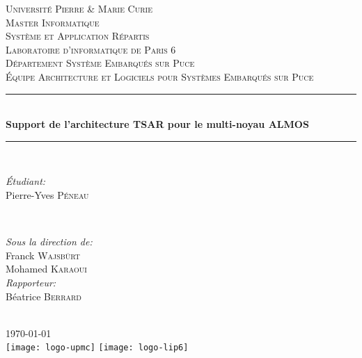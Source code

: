 \begin{titlepage}

\newcommand{\HRule}{\rule{\linewidth}{0.44mm}}
\center


\textsc{\LARGE Université Pierre \& Marie Curie}\\[0.44cm]
\textsc{\Large Master Informatique}\\[0.44cm]
\textsc{\large Système et Application Répartis}\\[1.44cm]

\textsc{\LARGE Laboratoire d'informatique de Paris 6}\\[0.44cm]
\textsc{\Large Département Système Embarqués sur Puce}\\[0.44cm]
\textsc{\large Équipe Architecture et Logiciels pour Systèmes Embarqués sur
  Puce}\\[1.44cm]

\HRule \\[0.4cm] { \huge
  \bfseries Support de l'architecture TSAR pour le multi-noyau ALMOS}\\[0.4cm]
\HRule \\[1.44cm]


\begin{minipage}{0.4\textwidth}
\begin{flushleft} \large
\emph{Étudiant:}\\ Pierre-Yves \textsc{Péneau}
\end{flushleft}
\end{minipage}
~
\begin{minipage}{0.4\textwidth}
\begin{flushright} \large
  \emph{Sous la direction de:} \\ Franck \textsc{Wajsbürt}\\ Mohamed
  \textsc{Karaoui}\\\vspace{1.44cm} \emph{Rapporteur:} \\ Béatrice
  \textsc{Berrard}
\end{flushright}
\end{minipage}\\[2cm]


{\large \today}\\[1cm]


\texttt{[image: logo-upmc]}\hspace{3cm}
\texttt{[image: logo-lip6]}\\[1cm]
\vfill

\end{titlepage}
